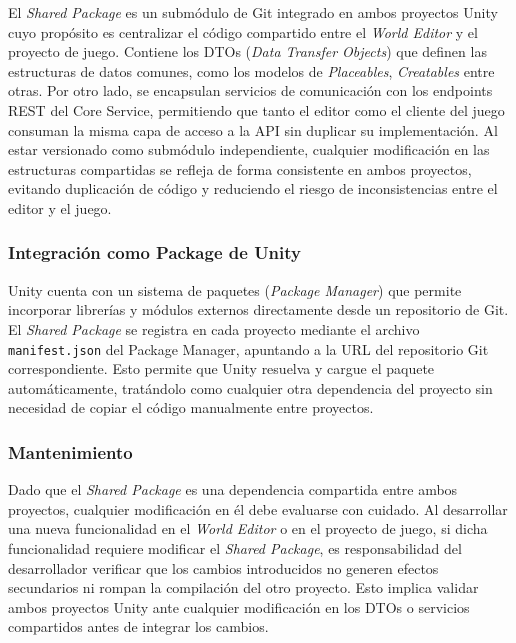 El \textit{Shared Package} es un submódulo de Git integrado en ambos proyectos Unity cuyo propósito es
centralizar el código compartido entre el \textit{World Editor} y el proyecto de juego. 
\vspace{0.25cm}
Contiene los DTOs (\textit{Data Transfer Objects}) que definen las estructuras de datos comunes, como los modelos de
\textit{Placeables}, \textit{Creatables} entre otras. Por otro lado, se encapsulan servicios de comunicación
con los endpoints REST del Core Service, permitiendo que tanto el editor como el cliente del juego
consuman la misma capa de acceso a la API sin duplicar su implementación. Al estar versionado como
submódulo independiente, cualquier modificación en las estructuras compartidas se refleja de forma
consistente en ambos proyectos, evitando duplicación de código y reduciendo el riesgo de inconsistencias
entre el editor y el juego.

\subsubsection{Integración como Package de Unity}

Unity cuenta con un sistema de paquetes (\textit{Package Manager}) que permite incorporar librerías y
módulos externos directamente desde un repositorio de Git. El \textit{Shared Package} se registra en
cada proyecto mediante el archivo \texttt{manifest.json} del Package Manager, apuntando a la URL del
repositorio Git correspondiente. Esto permite que Unity resuelva y cargue el paquete automáticamente,
tratándolo como cualquier otra dependencia del proyecto sin necesidad de copiar el código manualmente
entre proyectos.

\subsubsection{Mantenimiento}
Dado que el \textit{Shared Package} es una dependencia compartida entre ambos proyectos, cualquier
modificación en él debe evaluarse con cuidado. Al desarrollar una nueva funcionalidad en el \textit{World Editor}
o en el proyecto de juego, si dicha funcionalidad requiere modificar el \textit{Shared Package}, es
responsabilidad del desarrollador verificar que los cambios introducidos no generen efectos secundarios
ni rompan la compilación del otro proyecto. Esto implica validar ambos proyectos Unity ante cualquier
modificación en los DTOs o servicios compartidos antes de integrar los cambios.